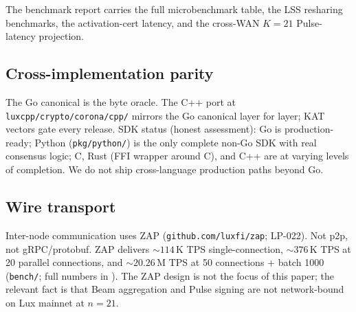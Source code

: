 The benchmark report \cite{luxbenchmarks} carries the full microbenchmark table, the LSS resharing benchmarks, the activation-cert latency, and the cross-WAN $K=21$ Pulse-latency projection.

\subsection{Cross-implementation parity}

The Go canonical \cite{consensusgo, pulsar, thresholdgo, lensgo, warpgo} is the byte oracle. The C++ port at \texttt{luxcpp/crypto/corona/cpp/} \cite{lp137} mirrors the Go canonical layer for layer; KAT vectors gate every release. SDK status (honest assessment): Go is production-ready; Python (\texttt{pkg/python/}) is the only complete non-Go SDK with real consensus logic; C, Rust (FFI wrapper around C), and C++ are at varying levels of completion. We do not ship cross-language production paths beyond Go.

\subsection{Wire transport}

Inter-node communication uses ZAP (\texttt{github.com/luxfi/zap}; LP-022). Not p2p, not gRPC/protobuf. ZAP delivers $\sim 114\,\mathrm{K}$ TPS single-connection, $\sim 376\,\mathrm{K}$ TPS at 20 parallel connections, and $\sim 20.26\,\mathrm{M}$ TPS at 50 connections + batch 1000 (\texttt{bench/}; full numbers in \cite{luxbenchmarks}). The ZAP design is not the focus of this paper; the relevant fact is that Beam aggregation and Pulse signing are not network-bound on Lux mainnet at $n = 21$.
